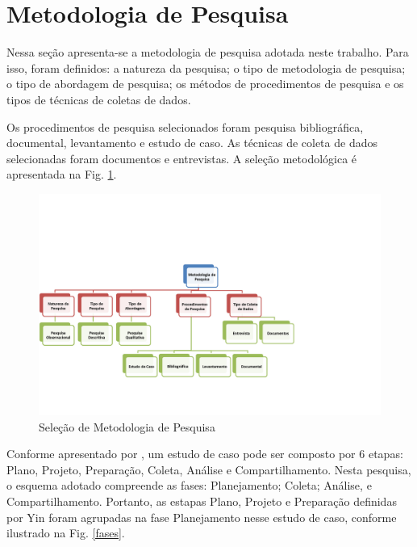 \section[Metodologia de Pesquisa]{Metodologia de Pesquisa}

Nessa seção apresenta-se a metodologia de pesquisa adotada neste trabalho.
Para isso, foram definidos: a natureza da pesquisa; o tipo de metodologia de pesquisa; o tipo de abordagem de pesquisa; os métodos de
procedimentos de pesquisa e os tipos de técnicas de coletas de dados.

Os procedimentos de pesquisa selecionados foram pesquisa bibliográfica,
documental, levantamento e estudo de caso. As técnicas de coleta de dados selecionadas foram
documentos e entrevistas. A seleção
metodológica é apresentada na Fig. \ref{met}.

	\begin{figure}[h]
		\centering
		
			\includegraphics[scale=0.7]{figuras/metodologiapesquisa.png}
		\caption{Seleção de Metodologia de Pesquisa}
		\label{met}
	\end{figure}

Conforme apresentado por , um estudo de caso pode ser composto por 6 etapas: Plano, Projeto, Preparação, Coleta, Análise e Compartilhamento. Nesta pesquisa, o esquema adotado compreende as fases: Planejamento; Coleta; Análise, e Compartilhamento. Portanto, as estapas Plano, Projeto e Preparação definidas por Yin foram agrupadas na fase Planejamento nesse estudo de caso, conforme ilustrado na Fig. \ref{fases}.


